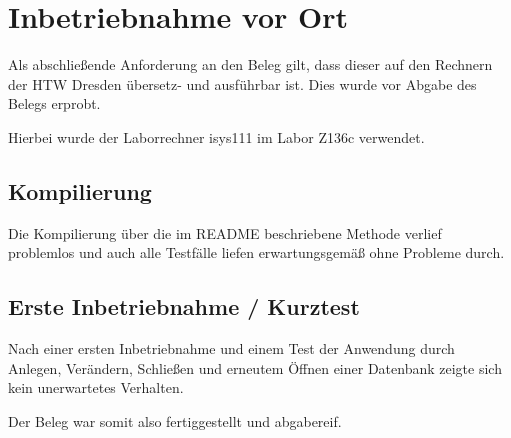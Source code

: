\section{Inbetriebnahme vor Ort}
Als abschließende Anforderung an den Beleg gilt, dass dieser auf den Rechnern der HTW Dresden übersetz- und ausführbar
ist. Dies wurde vor Abgabe des Belegs erprobt.

Hierbei wurde der Laborrechner isys111 im Labor Z136c verwendet.

\subsection{Kompilierung}
Die Kompilierung über die im README beschriebene Methode verlief problemlos und auch alle Testfälle liefen
erwartungsgemäß ohne Probleme durch.

\subsection{Erste Inbetriebnahme / Kurztest}
Nach einer ersten Inbetriebnahme und einem Test der Anwendung durch Anlegen, Verändern, Schließen und erneutem Öffnen
einer Datenbank zeigte sich kein unerwartetes Verhalten.

Der Beleg war somit also fertiggestellt und abgabereif.
